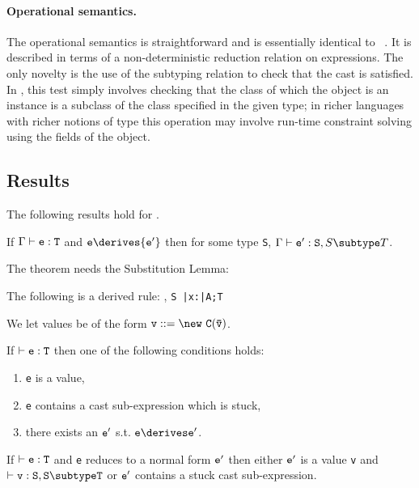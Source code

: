 \paragraph{Operational semantics.}

The operational semantics is straightforward and is essentially identical
to \FJ~\cite{FJ}. It is described in terms of a non-deterministic
reduction relation on expressions. The only novelty is the use of the
subtyping relation to check that the cast is satisfied. In \FXZ, this
test simply involves checking that the class of which the object is an
instance is a subclass of the class specified in the given type; in
richer languages with richer notions of type this operation may
involve run-time constraint solving using the fields of the object.


\subsection{Results}
The following results hold for \FXD.

\begin{theorem} If $\Gamma \vdash {\tt e:T}$ and ${\tt e} \derives {\tt e'}$ then for some type {\tt S}, $\Gamma \vdash {\tt e':S},{S \subtype T}$.
\end{theorem}

The theorem needs the Substitution Lemma:
\begin{lemma} The following is a derived rule:
{\Gamma {}, {\tt S \subtype \bar{\tt x}:\bar{\tt A};T}}
\end{lemma}

We let values be of the form $\tt v ::= \new\ C(\bar{\tt v})$. 
\begin{theorem}[Progress]
If $\vdash {\tt e:T}$ then one of the following conditions holds:
\begin{enumerate}
\item {\tt e} is a value,
\item {\tt e} contains a cast sub-expression which is stuck,
\item there exists an $\tt e'$ s.t. $\tt e\derives e'$.
\end{enumerate}
\end{theorem}

\begin{theorem}
If $\vdash {\tt e:T}$ and {\tt e} reduces to a normal form ${\tt e'}$ then
either $\tt e'$ is a value {\tt v} and $\vdash {\tt v:S},{\tt S\subtype T}$ or
${\tt e'}$ contains  a stuck cast sub-expression.
\end{theorem}




